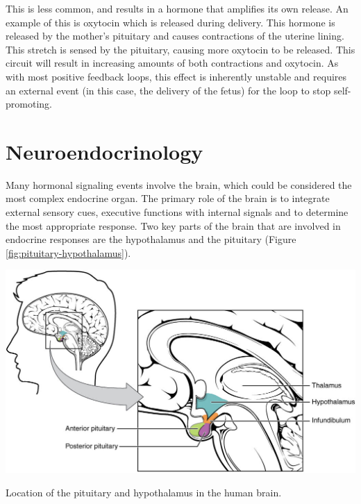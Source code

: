 \documentclass{tufte-handout}
\begin{document}
  This is less common, and results in a hormone that amplifies its own release.  An example of this is oxytocin which is released during delivery.  This hormone is released by the mother's pituitary and causes contractions of the uterine lining.  This stretch is sensed by the pituitary, causing more oxytocin to be released.  This circuit will result in increasing amounts of both contractions and oxytocin.  As with most positive feedback loops, this effect is inherently unstable and requires an external event (in this case, the delivery of the fetus) for the loop to stop self-promoting.

\section{Neuroendocrinology}

Many hormonal signaling events involve the brain, which could be considered the most complex endocrine organ.  The primary role of the brain is to integrate external sensory cues, executive functions with internal signals and to determine the most appropriate response.  Two key parts of the brain that are involved in endocrine responses are the hypothalamus and the pituitary (Figure \ref{fig:pituitary-hypothalamus}).

\begin{marginfigure}
  \includegraphics{figures/pituitary-hypothalamus}
  \caption{Location of the pituitary and hypothalamus in the human brain.}
    \label{fig:pituitary-hypothalamus}
\end{marginfigure}
\end{document}
